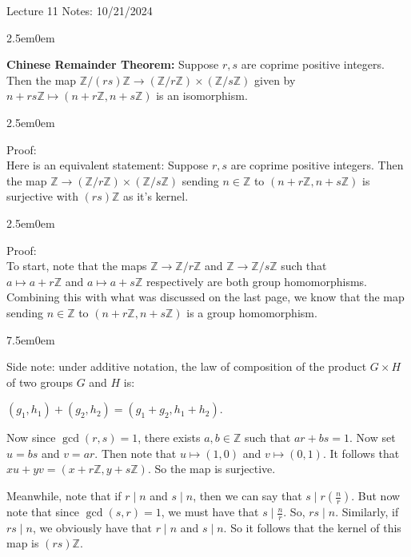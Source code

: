 \documentclass{book}
\newcommand{\hTwo}{%
\color{MidnightBlue}%
   \fontsize{13}{15}\selectfont%
}
\newcommand{\hThree}{%
   \color{PineGreen!85!Orange}
   \fontsize{12}{14}\selectfont%
}
\newcommand{\hFour}{%
   \color{Cyan!80!black}
   \fontsize{12}{14}\selectfont%
}
\newcommand{\myComment}{%
   \color{RawerSienna}%
   \fontsize{12}{14}\selectfont%
}
\newenvironment{myIndent}{%
   \begin{adjustwidth}{2.5em}{0em}%
}{%
   \end{adjustwidth}%
}
\newenvironment{myTindent}{%
   \begin{adjustwidth}{7.5em}{0em}%
}{%
   \end{adjustwidth}%
}
\newcommand{\blab}[1]{\textbf{#1}}
\newcommand{\divides}{\mathop{\mid}}
\newcommand{\retTwo}{\hfill\bigbreak}
\newcommand{\mHeader}[1]{{
   \color{Black}%
   \fontsize{20}{18}\selectfont%
   #1\retTwo
}}
\begin{document}
\mHeader{Lecture 11 Notes: 10/21/2024}

\begin{myIndent}\hTwo
	\blab{Chinese Remainder Theorem:} Suppose $r, s$ are coprime positive integers. Then the map $\mathbb{Z} / (rs)\mathbb{Z} \longrightarrow (\mathbb{Z} / r\mathbb{Z}) \times (\mathbb{Z} / s\mathbb{Z})$ given by $n + rs\mathbb{Z} \mapsto (n + r\mathbb{Z}, n + s\mathbb{Z})$ is an isomorphism.

	\begin{myIndent}\hThree
		Proof:\\
		Here is an equivalent statement: Suppose $r, s$ are coprime positive integers. Then the map $\mathbb{Z} \longrightarrow (\mathbb{Z} / r\mathbb{Z}) \times (\mathbb{Z} / s\mathbb{Z})$ sending $n \in \mathbb{Z}$ to $(n + r\mathbb{Z}, n + s\mathbb{Z})$ is surjective with $(rs)\mathbb{Z}$ as it's kernel.

		
		\begin{myIndent}\hFour
			Proof:\\
			To start, note that the maps $\mathbb{Z} \longrightarrow \mathbb{Z} / r\mathbb{Z}$ and $\mathbb{Z} \longrightarrow \mathbb{Z} / s\mathbb{Z}$ such that\\ $a \mapsto a + r\mathbb{Z}$ and $a \mapsto a + s\mathbb{Z}$ respectively are both group homomorphisms.      Combining this with what was discussed on the last page, we know that the map sending $n \in \mathbb{Z}$ to $(n + r\mathbb{Z}, n + s\mathbb{Z})$ is a group homomorphism.\retTwo

			
			\begin{myTindent}\myComment
				Side note: under additive notation, the law of composition of the product $G \times H$ of two groups $G$ and $H$ is:
				
				{\centering$(g_1, h_1) + (g_2, h_2) = (g_1 + g_2, h_1 + h_2)$.\retTwo\par}
			\end{myTindent}
			
			Now since $\gcd(r, s) = 1$, there exists $a, b \in \mathbb{Z}$ such that $ar + bs = 1$. Now set $u = bs$ and $v = ar$. Then note that $u \mapsto (1, 0)$ and $v \mapsto (0, 1)$. It follows that $xu + yv = (x + r\mathbb{Z}, y + s\mathbb{Z})$. So the map is surjective.\retTwo

			Meanwhile, note that if $r \divides n$ and $s \divides n$, then we can say that $s \divides r(\frac{n}{r})$. But now note that since $\gcd(s, r) = 1$, we must have that $s \divides \frac{n}{r}$. So, $rs \divides n$. Similarly, if $rs \divides n$, we obviously have that $r \divides n$ and $s \divides n$. So it follows that the kernel of this map is $(rs)\mathbb{Z}$.\retTwo
		\end{myIndent}


\end{myIndent}
\end{myIndent}
\end{document}
